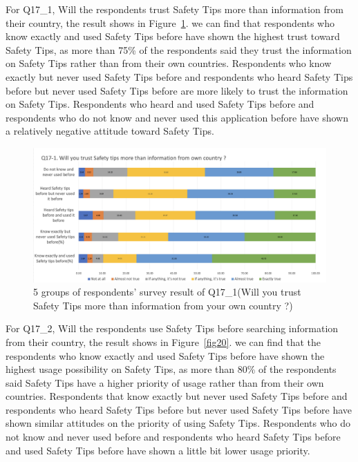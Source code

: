 For Q17\_1, Will the respondents trust Safety Tips more than information from their country, the result shows in Figure~\ref{fig19}. we can find that respondents who know exactly and used Safety Tips before have shown the highest trust toward Safety Tips, as more than 75\% of the respondents said they trust the information on Safety Tips rather than from their own countries. Respondents who know exactly but never used Safety Tips before and respondents who heard Safety Tips before but never used Safety Tips before are more likely to trust the information on Safety Tips. Respondents who heard and used Safety Tips before and respondents who do not know and never used this application before have shown a relatively negative attitude toward Safety Tips. 

\begin{figure}[h]
  \includegraphics[width=0.8\linewidth]{Figure/Figure19.jpg}
  \centering
  \caption[5 groups of respondents' survey result of Q17\_1]{5 groups of respondents' survey result of Q17\_1(Will you trust Safety Tips more than information from your own country ?)}
  \label{fig19}
\end{figure}

For Q17\_2, Will the respondents use Safety Tips before searching information from their country, the result shows in Figure~\ref{fig20}. we can find that the respondents who know exactly and used Safety Tips before have shown the highest usage possibility on Safety Tips, as more than 80\% of the respondents said Safety Tips have a higher priority of usage rather than from their own countries. Respondents that know exactly but never used Safety Tips before and respondents who heard Safety Tips before but never used Safety Tips before have shown similar attitudes on the priority of using Safety Tips. Respondents who do not know and never used before and respondents who heard Safety Tips before and used Safety Tips before have shown a little bit lower usage priority. 

